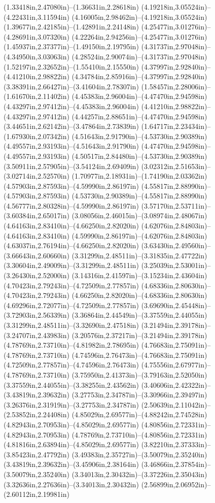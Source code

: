 (1.33418in,2.47080in)--(1.36631in,2.28618in) (4.19218in,3.05524in)--(4.22431in,3.11594in) (4.16005in,2.98462in)--(4.19218in,3.05524in) (1.39677in,2.42185in)--(1.42891in,2.24148in) (4.25477in,3.01276in)--(4.28691in,3.07320in) (4.22264in,2.94256in)--(4.25477in,3.01276in) (1.45937in,2.37377in)--(1.49150in,2.19795in) (4.31737in,2.97048in)--(4.34950in,3.03063in) (4.28524in,2.90074in)--(4.31737in,2.97048in) (1.52197in,2.32652in)--(1.55410in,2.15550in) (4.37997in,2.92840in)--(4.41210in,2.98822in) (4.34784in,2.85916in)--(4.37997in,2.92840in) (3.38391in,2.66427in)--(3.41604in,2.78307in) (1.58457in,2.28006in)--(1.61670in,2.11402in) (4.45383in,2.96004in)--(4.47470in,2.94598in) (4.43297in,2.97412in)--(4.45383in,2.96004in) (4.41210in,2.98822in)--(4.43297in,2.97412in) (4.44257in,2.88651in)--(4.47470in,2.94598in) (3.44651in,2.62142in)--(3.47864in,2.73839in) (1.64717in,2.23434in)--(1.67930in,2.07342in) (4.51643in,2.91790in)--(4.53730in,2.90389in) (4.49557in,2.93193in)--(4.51643in,2.91790in) (4.47470in,2.94598in)--(4.49557in,2.93193in) (4.50517in,2.84480in)--(4.53730in,2.90389in) (3.50911in,2.57905in)--(3.54124in,2.69409in) (3.02312in,2.51653in)--(3.02714in,2.52570in) (1.70977in,2.18931in)--(1.74190in,2.03362in) (4.57903in,2.87593in)--(4.59990in,2.86197in) (4.55817in,2.88990in)--(4.57903in,2.87593in) (4.53730in,2.90389in)--(4.55817in,2.88990in) (4.56777in,2.80328in)--(4.59990in,2.86197in) (3.57170in,2.53711in)--(3.60384in,2.65017in) (3.08056in,2.46015in)--(3.08974in,2.48067in) (4.64163in,2.83410in)--(4.66250in,2.82020in) (4.62076in,2.84803in)--(4.64163in,2.83410in) (4.59990in,2.86197in)--(4.62076in,2.84803in) (4.63037in,2.76194in)--(4.66250in,2.82020in) (3.63430in,2.49560in)--(3.66643in,2.60660in) (3.31299in,2.48511in)--(3.31835in,2.47722in) (3.30604in,2.49009in)--(3.31299in,2.48511in) (3.25039in,2.53001in)--(3.26430in,2.52000in) (3.14316in,2.41597in)--(3.15234in,2.43604in) (4.70423in,2.79243in)--(4.72509in,2.77857in) (4.68336in,2.80630in)--(4.70423in,2.79243in) (4.66250in,2.82020in)--(4.68336in,2.80630in) (4.69296in,2.72077in)--(4.72509in,2.77857in) (3.69690in,2.45448in)--(3.72903in,2.56339in) (3.36864in,2.44549in)--(3.37559in,2.44055in) (3.31299in,2.48511in)--(3.32690in,2.47518in) (3.21494in,2.39178in)--(3.24707in,2.43983in) (3.20576in,2.37217in)--(3.21494in,2.39178in) (4.78769in,2.73710in)--(4.81982in,2.78695in) (4.76683in,2.75091in)--(4.78769in,2.73710in) (4.74596in,2.76473in)--(4.76683in,2.75091in) (4.72509in,2.77857in)--(4.74596in,2.76473in) (4.75556in,2.67977in)--(4.78769in,2.73710in) (3.75950in,2.41373in)--(3.79163in,2.52050in) (3.37559in,2.44055in)--(3.38255in,2.43562in) (3.40606in,2.42322in)--(3.43819in,2.39632in) (3.27753in,2.34787in)--(3.30966in,2.39497in) (3.26376in,2.31919in)--(3.27753in,2.34787in) (2.50639in,2.11042in)--(2.53852in,2.24408in) (4.85029in,2.69577in)--(4.88242in,2.74528in) (4.82943in,2.70953in)--(4.85029in,2.69577in) (4.80856in,2.72331in)--(4.82943in,2.70953in) (4.78769in,2.73710in)--(4.80856in,2.72331in) (4.81816in,2.63894in)--(4.85029in,2.69577in) (3.82210in,2.37333in)--(3.85423in,2.47792in) (3.49383in,2.35727in)--(3.50079in,2.35240in) (3.43819in,2.39632in)--(3.45906in,2.38164in) (3.46866in,2.37854in)--(3.50079in,2.35240in) (3.34013in,2.30432in)--(3.37226in,2.35043in) (3.32636in,2.27636in)--(3.34013in,2.30432in) (2.56899in,2.06952in)--(2.60112in,2.19981in) 
